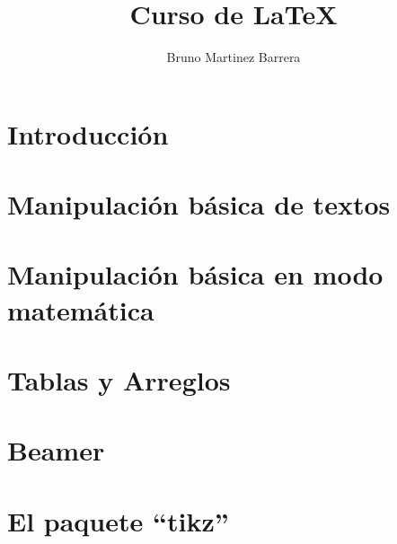 \documentclass[letterpaper,12pt]{book}
\title{Curso de \LaTeX}
\author{Bruno Martinez Barrera}
\begin{document}
    
\maketitle
\tableofcontents
	
\chapter{Introducción}
	
    
    
\chapter{Manipulación básica de textos}
    
    
    
\chapter{Manipulación básica en modo matemática}
    
    
    
\chapter{Tablas y Arreglos}

    
    
\chapter{Beamer}

    
    
\chapter{El paquete ``tikz''}

    
\end{document}
